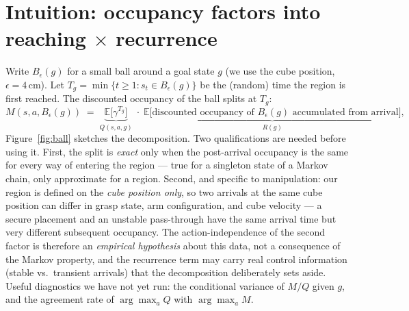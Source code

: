 \documentclass[10pt]{article}
\newcommand{\E}{\mathbb{E}}
\begin{document}
\section{Intuition: occupancy factors into reaching $\times$ recurrence}
\label{sec:intuition}

Write $B_\epsilon(g)$ for a small ball around a goal state $g$ (we use the cube position, $\epsilon=4$\,cm).
Let $T_g=\min\{t\ge 1: s_t\in B_\epsilon(g)\}$ be the (random) time the region is first reached.
The discounted occupancy of the ball splits at $T_g$:
\begin{equation}
\label{eq:factor}
M(s,a,B_\epsilon(g))
\;=\;
\underbrace{\E\big[\gamma^{T_g}\big]}_{\textstyle Q(s,a,g)}
\;\cdot\;
\underbrace{\E\big[\text{discounted occupancy of } B_\epsilon(g)\text{ accumulated from arrival}\big]}_{\textstyle R(g)},
\end{equation}
Figure~\ref{fig:ball} sketches the decomposition.
Two qualifications are needed before using it.
First, the split is \emph{exact} only when the post-arrival occupancy is the same for every
way of entering the region --- true for a singleton state of a Markov chain, only
approximate for a region.
Second, and specific to manipulation: our region is defined on the \emph{cube position
only}, so two arrivals at the same cube position can differ in grasp state, arm
configuration, and cube velocity --- a secure placement and an unstable pass-through have
the same arrival time but very different subsequent occupancy.
The action-independence of the second factor is therefore an \emph{empirical hypothesis}
about this data, not a consequence of the Markov property, and the recurrence term may
carry real control information (stable vs.\ transient arrivals) that the decomposition
deliberately sets aside.
Useful diagnostics we have not yet run: the conditional variance of $M/Q$ given $g$, and
the agreement rate of $\arg\max_a Q$ with $\arg\max_a M$.
\end{document}
